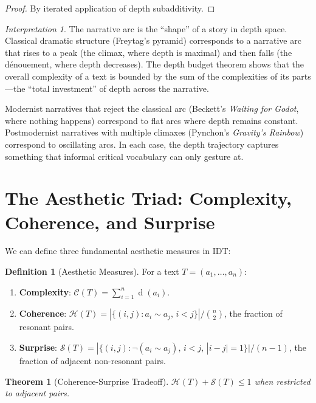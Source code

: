 \documentclass[11pt,openany]{book}
\theoremstyle{definition}
\newtheorem{definition}[axiom]{Definition}
\theoremstyle{plain}
\newtheorem{theorem}[axiom]{Theorem}
\theoremstyle{remark}
\newtheorem{interpretation}[axiom]{Interpretation}
\newcommand{\res}{\sim}                      %
\newcommand{\depth}{\operatorname{d}}       %
\begin{document}
\begin{proof}
By iterated application of depth subadditivity.
\end{proof}

\begin{interpretation}
The narrative arc is the ``shape'' of a story in depth space. Classical dramatic structure (Freytag's pyramid) corresponds to a narrative arc that rises to a peak (the climax, where depth is maximal) and then falls (the dénouement, where depth decreases). The depth budget theorem shows that the overall complexity of a text is bounded by the sum of the complexities of its parts---the ``total investment'' of depth across the narrative.

Modernist narratives that reject the classical arc (Beckett's \emph{Waiting for Godot}, where nothing happens) correspond to flat arcs where depth remains constant. Postmodernist narratives with multiple climaxes (Pynchon's \emph{Gravity's Rainbow}) correspond to oscillating arcs. In each case, the depth trajectory captures something that informal critical vocabulary can only gesture at.
\end{interpretation}

\section{The Aesthetic Triad: Complexity, Coherence, and Surprise}

We can define three fundamental aesthetic measures in IDT:

\begin{definition}[Aesthetic Measures]
For a text $T = (a_1, \ldots, a_n)$:
\begin{enumerate}
\item \textbf{Complexity}: $\mathcal{C}(T) = \sum_{i=1}^n \depth(a_i)$.
\item \textbf{Coherence}: $\mathcal{H}(T) = |\{(i,j) : a_i \res a_j, \, i < j\}| / \binom{n}{2}$, the fraction of resonant pairs.
\item \textbf{Surprise}: $\mathcal{S}(T) = |\{(i,j) : \neg(a_i \res a_j), \, i < j, \, |i - j| = 1\}| / (n-1)$, the fraction of adjacent non-resonant pairs.
\end{enumerate}
\end{definition}

\begin{theorem}[Coherence-Surprise Tradeoff]
$\mathcal{H}(T) + \mathcal{S}(T) \leq 1$ when restricted to adjacent pairs.
\end{theorem}
\end{document}
